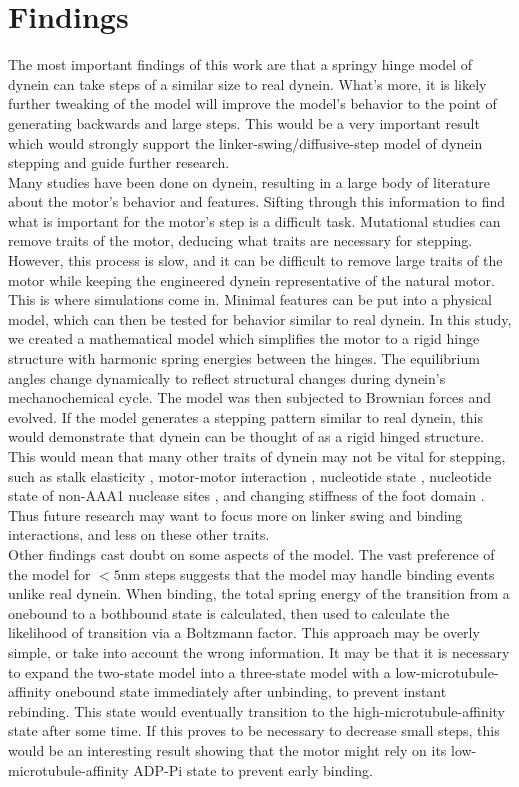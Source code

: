 \documentclass[
11pt, %
english, %
singlespacing, %
headsepline, %
chapterinoneline, %
]{MastersDoctoralThesis} %
\begin{document}
\section{Findings}
The most important findings of this work are that a springy hinge model of dynein can take steps of a similar size to real dynein. What's more, it is likely further tweaking of the model will improve the model's behavior to the point of generating backwards and large steps. This would be a very important result which would strongly support the linker-swing/diffusive-step model of dynein stepping and guide further research.\\

Many studies have been done on dynein, resulting in a large body of literature about the motor's behavior and features. Sifting through this information to find what is important for the motor's step is a difficult task. Mutational studies can remove traits of the motor, deducing what traits are necessary for stepping. However, this process is slow, and it can be difficult to remove large traits of the motor while keeping the engineered dynein representative of the natural motor. This is where simulations come in. Minimal features can be put into a physical model, which can then be tested for behavior similar to real dynein. In this study, we created a mathematical model which simplifies the motor to a rigid hinge structure with harmonic spring energies between the hinges. The equilibrium angles change dynamically to reflect structural changes during dynein's mechanochemical cycle. The model was then subjected to Brownian forces and evolved. If the model generates a stepping pattern similar to real dynein, this would demonstrate that dynein can be thought of as a rigid hinged structure. This would mean that many other traits of dynein may not be vital for stepping, such as stalk elasticity \cite{sarlahmodel}, motor-motor interaction \cite{sarlahmodel}, nucleotide state \cite{cianfroccoreview}, nucleotide state of non-AAA1 nuclease sites \cite{cianfroccoreview}, and changing stiffness of the foot domain \cite{burgess-paper}. Thus future research may want to focus more on linker swing and binding interactions, and less on these other traits.\\

Other findings cast doubt on some aspects of the model. The vast preference of the model for $<5$nm steps suggests that the model may handle binding events unlike real dynein. When binding, the total spring energy of the transition from a onebound to a bothbound state is calculated, then used to calculate the likelihood of transition via a Boltzmann factor. This approach may be overly simple, or take into account the wrong information. It may be that it is necessary to expand the two-state model into a three-state model with a low-microtubule-affinity onebound state immediately after unbinding, to prevent instant rebinding. This state would eventually transition to the high-microtubule-affinity state after some time. If this proves to be necessary to decrease small steps, this would be an interesting result showing that the motor might rely on its low-microtubule-affinity ADP-Pi state to prevent early binding.\\
\end{document}
